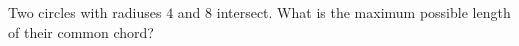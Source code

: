 Two circles with radiuses $4$ and $8$ intersect. What is the maximum possible length of their common chord?
